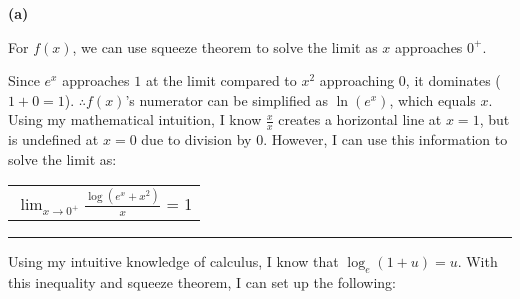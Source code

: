 \documentclass[answers,addpoints]{exam}
\begin{document}
\begin{questions}

\begin{solution}

\begin{center}
\end{center}

\textbf{(a)}

For $f(x)$, we can use squeeze theorem to solve the limit as $x$ approaches $0^+$.

Since $e^{x}$ approaches $1$ at the limit compared to $x^{2}$ approaching $0$, it dominates ($1+0=1$). $\therefore f(x)$’s numerator can be simplified as $\ln(e^{x})$, which equals $x$. Using my mathematical intuition, I know $\frac{x}{x}$ creates a horizontal line at $x=1$, but is undefined at $x=0$ due to division by 0. However, I can use this information to solve the limit as:

\begin{center}
\begin{tabular}{@{}l@{}}
$\displaystyle \lim_{x \to 0^+} \frac{\log(e^x+x^2)}{x}$ = 1\\[6pt]
\end{tabular}
\end{center}

\hrule

Using my intuitive knowledge of calculus, I know that $\log_{e}(1+u)=u$. With this inequality and squeeze theorem, I can set up the following:


\end{solution}
\end{questions}
\end{document}
